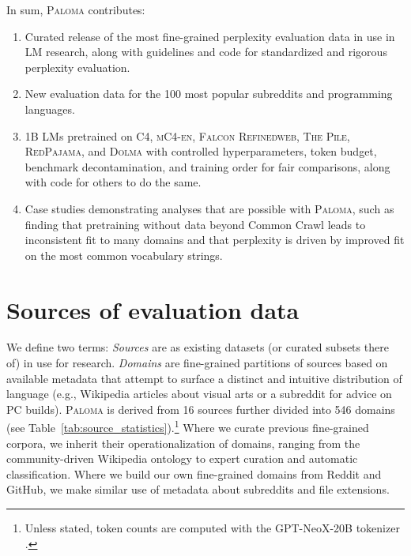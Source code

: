 In sum, \textsc{Paloma} contributes:

\begin{enumerate}
    \item Curated release of the most fine-grained perplexity evaluation data in use in LM research, along with guidelines and code for standardized and rigorous perplexity evaluation.
    \item New evaluation data for the 100 most popular subreddits and programming languages.
    \item 1B LMs pretrained on \textsc{C4}, \textsc{mC4-en}, \textsc{Falcon Refinedweb}, \textsc{The Pile}, \textsc{RedPajama}, and \textsc{Dolma} with controlled hyperparameters, token budget, benchmark decontamination, and training order for fair comparisons, along with code for others to do the same.
    \item Case studies demonstrating analyses that are possible with \textsc{Paloma}, such as finding that pretraining without data beyond Common Crawl leads to inconsistent fit to many domains and that perplexity is driven by improved fit on the most common vocabulary strings.
\end{enumerate}

\section{Sources of evaluation data}
\label{sec:selecting}

We define two terms: \emph{Sources} are as existing datasets (or curated subsets there of) in use for research. \emph{Domains} are fine-grained partitions of sources based on available metadata that attempt to surface a distinct and intuitive distribution of language (e.g., Wikipedia articles about visual arts or a subreddit for advice on PC builds). \textsc{Paloma} is derived from 16 sources further divided into 546 domains (see Table~\ref{tab:source_statistics}).\footnote{Unless stated, token counts are computed with the GPT-NeoX-20B tokenizer \citep{gpt-neo}.} Where we curate previous fine-grained corpora, we inherit their operationalization of domains, ranging from the community-driven Wikipedia ontology to expert curation and automatic classification. Where we build our own fine-grained domains from Reddit and GitHub, we make similar use of metadata about subreddits and file extensions.


